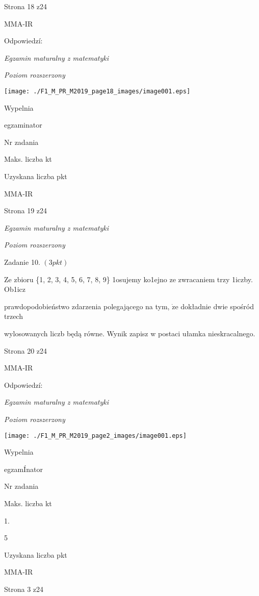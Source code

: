 \documentclass[a4paper,12pt]{article}
\begin{document}
Strona 18 z24

MMA-IR





Odpowiedzí:

{\it Egzamin maturalny z matematyki}

{\it Poziom rozszerzony}
\begin{center}
\texttt{[image: ./F1\_M\_PR\_M2019\_page18\_images/image001.eps]}
\end{center}
Wypelnia

egzaminator

Nr zadania

Maks. liczba kt

Uzyskana liczba pkt

MMA-IR

Strona 19 z24





{\it Egzamin maturalny z matematyki}

{\it Poziom rozszerzony}

Zadanie 10. $(3pkt)$

Ze zbioru \{1, 2, 3, 4, 5, 6, 7, 8, 9\} 1osujemy ko1ejno ze zwracaniem trzy 1iczby. Ob1icz

prawdopodobieństwo zdarzenia polegającego na tym, $\dot{\mathrm{z}}\mathrm{e}$ dokładnie dwie spośród trzech

wylosowanych liczb będą równe. Wynik zapisz w postaci ułamka nieskracalnego.

Strona 20 z24

MMA-IR





Odpowiedzí:

{\it Egzamin maturalny z matematyki}

{\it Poziom rozszerzony}
\begin{center}
\texttt{[image: ./F1\_M\_PR\_M2019\_page2\_images/image001.eps]}
\end{center}
Wypelnia

egzamÍnator

Nr zadania

Maks. liczba kt

1.

5

Uzyskana liczba pkt

MMA-IR

Strona 3 z24
\end{document}
